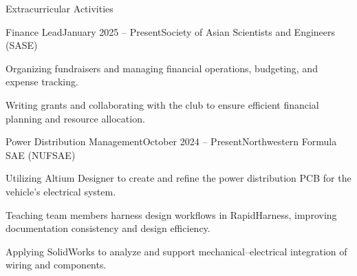 \documentclass[
    a4paper,
    9pt,
]{resume}
\begin{document}

\begin{rSection}{Extracurricular Activities}
\begin{rSubsection}{Finance Lead}{January 2025 -- Present}{Society of Asian Scientists and Engineers (SASE)}{}
	\item Organizing fundraisers and managing financial operations, budgeting, and expense tracking.
    \item Writing grants and collaborating with the club to ensure efficient financial planning and resource allocation.
    \end{rSubsection}
    
    \begin{rSubsection}{Power Distribution Management}{October 2024 -- Present}{Northwestern Formula SAE (NUFSAE)}{}{}
    	\item Utilizing Altium Designer to create and refine the power distribution PCB for the vehicle’s electrical system.
    	\item Teaching team members harness design workflows in RapidHarness, improving documentation consistency and design efficiency.
    	\item Applying SolidWorks to analyze and support mechanical–electrical integration of wiring and components.
    \end{rSubsection}





\end{rSection}
\end{document}
